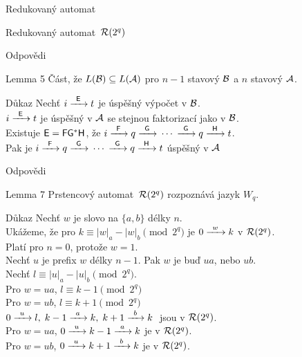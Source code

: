 \documentclass{beamer}
\begin{document}
\begin{frame}{Redukovaný automat}
      \begin{exampleblock}{Redukovaný automat~${\mathcal{R}}(2^q)$}
            \begin{center}
                  
            \end{center}
      \end{exampleblock}
\end{frame}

\begin{frame}{Odpovědi}
      \pause

      \begin{block}{Lemma 5}
            Část, že $L({\mathcal{B}}) \subseteq L({\mathcal{A}})$ pro $n-1$ stavový ${\mathcal{B}}$ a $n$ stavový ${\mathcal{A}}$.
      \end{block}

      \begin{block}{Důkaz}
            Nechť $i {\; \xrightarrow[]{\: \; {\mathsf{E}} \: \;} \;} t$ je úspěšný výpočet v ${\mathcal{B}}$. \\
            \quad $i {\; \xrightarrow[]{\: \; {\mathsf{E}} \: \;} \;} t$ je úspěšný v ${\mathcal{A}}$ se stejnou faktorizací jako v ${\mathcal{B}}$. \\
            \quad Existuje ${\mathsf{E}} = {\mathsf{F}}{{\mathsf{G}}}^*{\mathsf{H}}$, že $i {\; \xrightarrow[]{\: \; {\mathsf{F}} \: \;} \;} q {\; \xrightarrow[]{\: \; {\mathsf{G}} \: \;} \;} \dotsm {\; \xrightarrow[]{\: \; {\mathsf{G}} \: \;} \;} q {\; \xrightarrow[]{\: \; {\mathsf{H}} \: \;} \;} t$. \\
            Pak je $i {\; \xrightarrow[]{\: \; {\mathsf{F}} \: \;} \;} q {\; \xrightarrow[]{\: \; {\mathsf{G}} \: \;} \;} \dotsm {\; \xrightarrow[]{\: \; {\mathsf{G}} \: \;} \;} q {\; \xrightarrow[]{\: \; {\mathsf{H}} \: \;} \;} t$ úspěšný v ${\mathcal{A}}$ \\
      \end{block}
\end{frame}

\begin{frame}{Odpovědi}
      \begin{block}{Lemma 7}
            Prstencový automat~${\mathcal{R}}(2^q)$ rozpoznává jazyk $W_q$.
      \end{block}

      \begin{block}{Důkaz}
            Nechť $w$ je slovo na $\{a,b\}$ délky $n$. \\
            Ukážeme, že pro $k \equiv |w|_a - |w|_b \pmod{2^q}$ je $0 {\; \xrightarrow[]{\: \; w \: \;} \;} k$ v ${\mathcal{R}}(2^q)$.\\
            Platí pro $n = 0$, protože $w = 1$. \\
            Nechť $u$ je prefix $w$ délky $n-1$. Pak $w$ je buď $ua$, nebo $ub$. \\
            Nechť $l \equiv |u|_a - |u|_b \pmod{2^q}$. \\
            \quad Pro $w = ua$, $l \equiv k-1 \pmod{2^q}$ \\
            \quad Pro $w = ub$, $l \equiv k+1 \pmod{2^q}$ \\
            $0 {\; \xrightarrow[]{\: \; u \: \;} \;} l, \; k-1 {\; \xrightarrow[]{\: \; a \: \;} \;} k, \; k+1 {\; \xrightarrow[]{\: \; b \: \;} \;} k \;$ jsou v ${\mathcal{R}}(2^q)$. \\
            \quad Pro $w = ua$, $0 {\; \xrightarrow[]{\: \; u \: \;} \;} k-1 {\; \xrightarrow[]{\: \; a \: \;} \;} k$ je v ${\mathcal{R}}(2^q)$. \\
            \quad Pro $w = ub$, $0 {\; \xrightarrow[]{\: \; u \: \;} \;} k+1 {\; \xrightarrow[]{\: \; b \: \;} \;} k$ je v ${\mathcal{R}}(2^q)$. \\
      \end{block}
\end{frame}
\end{document}
